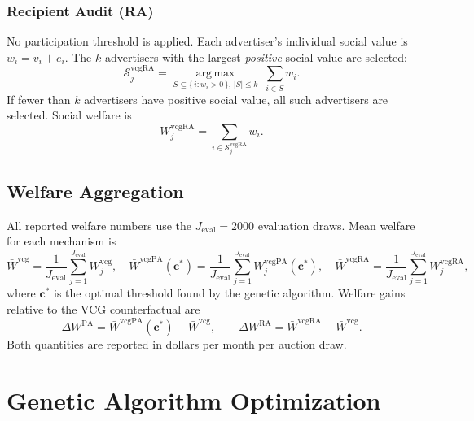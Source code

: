 \documentclass[11pt]{article}
\newcommand{\bsc}{\mathbf{c}}
\begin{document}
\subsubsection{Recipient Audit (RA)}

No participation threshold is applied.  Each advertiser's individual social value
is $w_i = v_i + e_i$.  The $k$ advertisers with the largest \emph{positive} social
value are selected:
\begin{equation}
    \mathcal{S}^{\text{vcgRA}}_j
    = \operatorname*{arg\,max}_{S \subseteq \{\,i : w_i > 0\,\},\,|S| \leq k}
      \;\sum_{i \in S} w_i.
    \label{eq:ra_winners}
\end{equation}
If fewer than $k$ advertisers have positive social value, all such advertisers are
selected.  Social welfare is
\begin{equation}
    W^{\text{vcgRA}}_j = \sum_{i \in \mathcal{S}^{\text{vcgRA}}_j} w_i.
\end{equation}

\subsection{Welfare Aggregation}

All reported welfare numbers use the $J_{\text{eval}} = 2000$ evaluation draws.
Mean welfare for each mechanism is
\begin{equation}
    \bar{W}^{\text{vcg}} = \frac{1}{J_{\text{eval}}}\sum_{j=1}^{J_{\text{eval}}} W^{\text{vcg}}_j, \quad
    \bar{W}^{\text{vcgPA}}(\bsc^*) = \frac{1}{J_{\text{eval}}}\sum_{j=1}^{J_{\text{eval}}} W^{\text{vcgPA}}_j(\bsc^*), \quad
    \bar{W}^{\text{vcgRA}} = \frac{1}{J_{\text{eval}}}\sum_{j=1}^{J_{\text{eval}}} W^{\text{vcgRA}}_j,
\end{equation}
where $\bsc^*$ is the optimal threshold found by the genetic algorithm.
Welfare gains relative to the VCG counterfactual are
\begin{equation}
    \Delta W^{\text{PA}} = \bar{W}^{\text{vcgPA}}(\bsc^*) - \bar{W}^{\text{vcg}},
    \qquad
    \Delta W^{\text{RA}} = \bar{W}^{\text{vcgRA}} - \bar{W}^{\text{vcg}}.
    \label{eq:delta_w}
\end{equation}
Both quantities are reported in dollars per month per auction draw.


\section{Genetic Algorithm Optimization}
\label{sec:ga}
\end{document}

